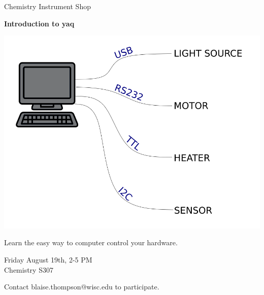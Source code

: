 \documentclass{article}
\begin{document}
\center

\Huge

Chemistry Instrument Shop

\textbf{
Introduction to yaq
}

\includegraphics[width=\linewidth]{coverart.png}

{
\huge
Learn the easy way to computer control your hardware.
}

\vfill

{
\huge
Friday August 19th, 2-5 PM \\
Chemistry S307
}

\vfill

{
\huge
Contact blaise.thompson@wisc.edu to participate.
}
\end{document}
